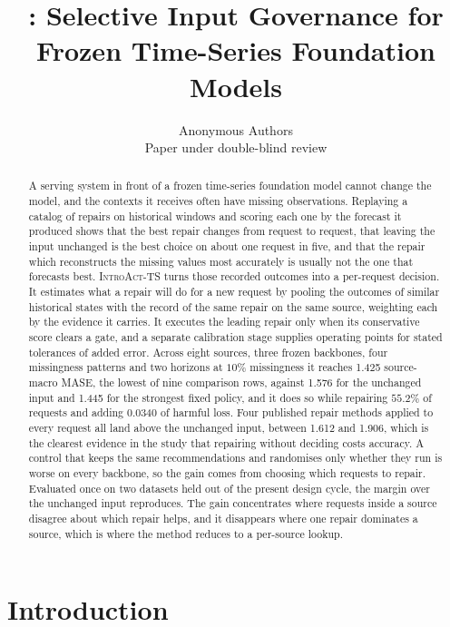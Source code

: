 \documentclass{article}
\title{\introact{}: Selective Input Governance for \\
Frozen Time-Series Foundation Models}
\author{Anonymous Authors\\Paper under double-blind review}
\newcommand{\introact}{\textsc{IntroAct-TS}}
\begin{document}
\maketitle

\begin{abstract}
A serving system in front of a frozen time-series foundation model cannot change the model,
and the contexts it receives often have missing observations. Replaying a catalog of repairs
on historical windows and scoring each one by the forecast it produced shows that the best
repair changes from request to request, that leaving the input unchanged is the best choice on
about one request in five, and that the repair which reconstructs the missing values most
accurately is usually not the one that forecasts best. \introact{} turns those recorded
outcomes into a per-request decision. It estimates what a repair will do for a new request by
pooling the outcomes of similar historical states with the record of the same repair on the
same source, weighting each by the evidence it carries. It executes the leading repair only
when its conservative score clears a gate, and a separate calibration stage supplies
operating points for stated tolerances of added error. Across eight sources, three frozen
backbones, four missingness patterns and two horizons at $10\%$ missingness it reaches 1.425
source-macro MASE, the lowest of nine comparison rows, against 1.576 for the unchanged input
and 1.445 for the strongest fixed policy, and it does so while repairing $55.2\%$ of requests
and adding 0.0340 of harmful loss. Four published repair methods applied to every request all
land above the unchanged input, between 1.612 and 1.906, which is the clearest evidence in the
study that repairing without deciding costs accuracy. A control that keeps the same
recommendations and randomises only whether they run is worse on every backbone, so the gain
comes from choosing which requests to repair. Evaluated once on two datasets held out of the
present design cycle, the margin over the unchanged input reproduces. The gain concentrates
where requests inside a source disagree about which repair helps, and it disappears where one
repair dominates a source, which is where the method reduces to a per-source lookup.

\end{abstract}

\section{Introduction}
\label{sec:intro}
\end{document}
